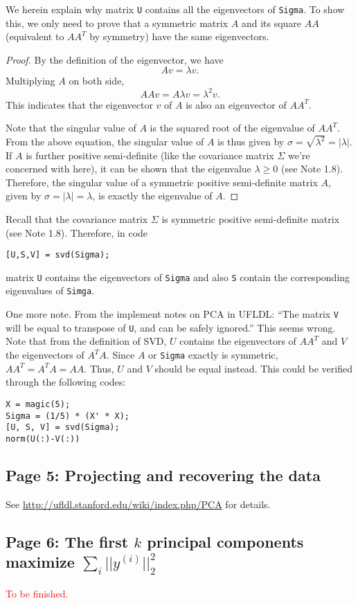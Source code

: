 \documentclass{article}
\begin{document}
We herein explain why matrix \texttt{U} contains all the eigenvectors of \texttt{Sigma}. To show this, we only need to prove that a symmetric matrix $A$ and its square $AA$ (equivalent to $AA^T$ by symmetry) have the same eigenvectors.
\begin{proof}
By the definition of the eigenvector, we have
\[
Av=\lambda v.
\]
Multiplying $A$ on both side,
\[
AAv=A\lambda v=\lambda^2v.
\]
This indicates that the eigenvector $v$ of $A$ is also an eigenvector of $AA^T$.

Note that the singular value of $A$ is the squared root of the eigenvalue of $AA^T$. From the above equation, the singular value of $A$ is thus given by $\sigma=\sqrt{\lambda^2}=|\lambda|$. If $A$ is further positive semi-definite (like the covariance matrix $\Sigma$ we're concerned with here), it can be shown that the eigenvalue $\lambda\geq 0$ (see Note 1.8). Therefore, the singular value of a symmetric positive semi-definite matrix $A$, given by $\sigma=|\lambda|=\lambda$, is exactly the eigenvalue of $A$.
\end{proof}

Recall that the covariance matrix $\Sigma$ is symmetric positive semi-definite matrix (see Note 1.8). Therefore, in code
 \begin{verbatim}
[U,S,V] = svd(Sigma);
\end{verbatim}
matrix \texttt{U} contains the eigenvectors of \texttt{Sigma} and also \texttt{S} contain the corresponding eigenvalues of \texttt{Simga}.

One more note. From the implement notes on PCA in UFLDL: ``The matrix \texttt{V} will be equal to transpose of \texttt{U}, and can be safely ignored.'' This seems wrong. Note that from the definition of SVD, $U$ contains the eigenvectors of $AA^T$ and $V$ the eigenvectors of $A^TA$. Since $A$ or \texttt{Sigma} exactly is symmetric, $AA^T=A^TA=AA$. Thus, $U$ and $V$ should be equal instead. This could be verified through the following codes:
\begin{verbatim}
X = magic(5);
Sigma = (1/5) * (X' * X);
[U, S, V] = svd(Sigma);
norm(U(:)-V(:))
\end{verbatim}


\subsection{Page 5: Projecting and recovering the data}
See \url{http://ufldl.stanford.edu/wiki/index.php/PCA} for details.

\subsection{Page 6: The first $k$ principal components maximize $\sum_i ||y^{(i)}||_2^2$}
\textcolor{red}{To be finished.}
\end{document}
